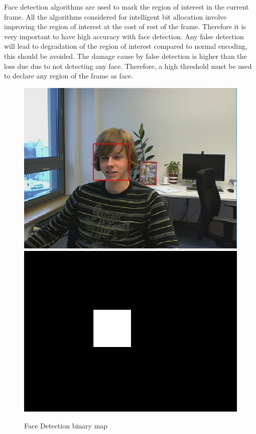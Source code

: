 \documentclass[11pt]{article} %
\begin{document}
Face detection algorithms are used to mark the region of interest in the current frame. All the algorithms considered for intelligent bit allocation involve improving the region of interest at the cost of rest of the frame. Therefore it is very important to have high accuracy with face detection. Any false detection will lead to degradation of the region of interest compared to normal encoding, this should be avoided. The damage cause by false detection is higher than the loss due due to not detecting any face. Therefore, a high threshold must be used to declare any region of the frame as face.
\begin{figure}[!h]
    \centering
    \includegraphics[scale=0.4]{PaulDefault120FaceRecognized}
    \includegraphics[scale=0.4]{PaulDefault120FaceMap}
    \caption{Face Detection binary map}
    \label{fig:PaulDefault120FaceMap}
\end{figure}
\end{document}
